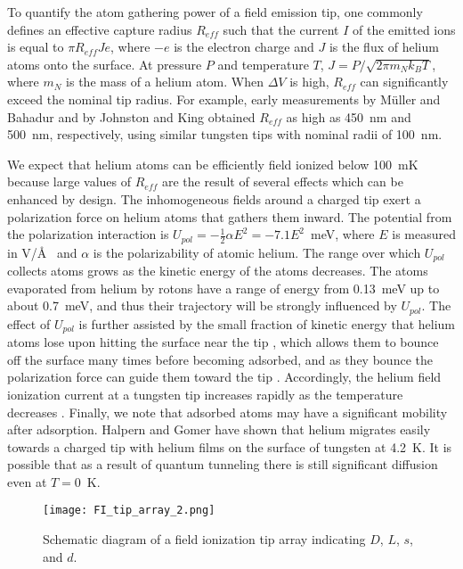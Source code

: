 \documentclass[10pt, letterpaper, reprint, superscriptaddress, aps, prl]
{revtex4-1} \usepackage[latin1]{inputenc}
\begin{document}
To quantify the atom gathering power of a field emission tip, one commonly defines an effective capture radius $R_{eff}$ such that the current $I$ of the emitted ions is equal to $\pi R_{eff}Je$, where $-e$ is the electron charge and $J$ is the flux of helium atoms onto the surface. 
At pressure $P$ and temperature $T$, $J=P/\sqrt{2\pi m_N k_BT}$, where $m_N$ is the mass of a helium atom. 
When $\Delta V$ is high, $R_{eff}$ can significantly exceed the nominal tip radius. 
For example, early measurements by M{\"u}ller and Bahadur \cite{Muller1956} and by Johnston and King \cite{Johnston1966} obtained $R_{eff}$ as high as 450~nm and 500~nm, respectively, using similar tungsten tips with nominal radii of 100~nm.

We expect that helium atoms can be efficiently field ionized below 100~mK because large values of $R_{eff}$ are the result of several effects which can be enhanced by design. 
The inhomogeneous fields around a charged tip exert a polarization force on helium atoms that gathers them inward. 
The potential from the polarization interaction is $U_{pol}=-\frac{1}{2}\alpha E^2=-7.1E^2$~meV, where $E$ is measured in V/\AA~ and $\alpha$ is the polarizability of atomic helium.
The range over which $U_{pol}$ collects atoms grows as the kinetic energy of the atoms decreases. 
The atoms evaporated from helium by rotons have a range of energy from 0.13~meV up to about 0.7~meV, and thus their trajectory will be strongly influenced by $U_{pol}$. 
The effect of $U_{pol}$ is further assisted by the small fraction of kinetic energy that helium atoms lose upon hitting the surface near the tip \cite{Goodman1980}, which allows them to bounce off the surface many times before becoming adsorbed, and as they bounce the polarization force can guide them toward the tip \cite{ODonnell2010}. 
Accordingly, the helium field ionization current at a tungsten tip increases rapidly as the temperature decreases \cite{Southon1963,Borret1990,Piskur2008}.
Finally, we note that adsorbed atoms may have a significant mobility after adsorption. 
Halpern and Gomer \cite{Halpern1969} have shown that helium migrates easily towards a charged tip with helium films on the surface of tungsten at 4.2~K. It is possible that as a result of quantum tunneling there is still significant diffusion even at $T=0$~K. 

\begin{figure}[!ht]
\centering\texttt{[image: FI\_tip\_array\_2.png]}
\caption{Schematic diagram of a field ionization tip array indicating $D$, $L$, $s$, and $d$.} 
\label{fig:FITipArray}
\end{figure}
\end{document}
